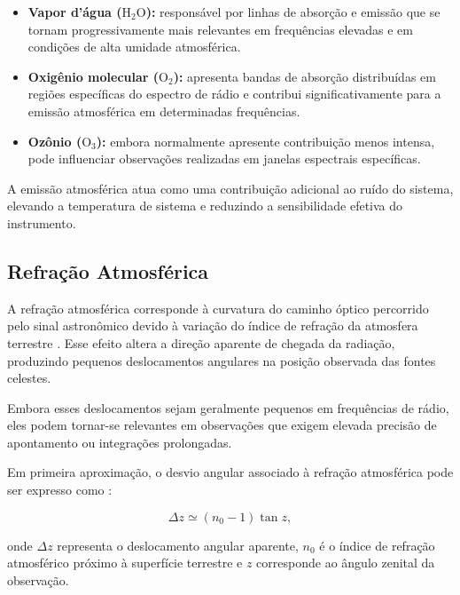 \begin{itemize}

\item \textbf{Vapor d'água ($\mathrm{H_2O}$):}
responsável por linhas de absorção e emissão que se tornam progressivamente mais relevantes em frequências elevadas e em condições de alta umidade atmosférica.

\item \textbf{Oxigênio molecular ($\mathrm{O_2}$):}
apresenta bandas de absorção distribuídas em regiões específicas do espectro de rádio e contribui significativamente para a emissão atmosférica em determinadas frequências.

\item \textbf{Ozônio ($\mathrm{O_3}$):}
embora normalmente apresente contribuição menos intensa, pode influenciar observações realizadas em janelas espectrais específicas.

\end{itemize}

A emissão atmosférica atua como uma contribuição adicional ao ruído do sistema, elevando a temperatura de sistema e reduzindo a sensibilidade efetiva do instrumento.

\subsection{Refração Atmosférica}

A refração atmosférica corresponde à curvatura do caminho óptico percorrido pelo sinal astronômico devido à variação do índice de refração da atmosfera terrestre \cite{thompson2017interferometry}. Esse efeito altera a direção aparente de chegada da radiação, produzindo pequenos deslocamentos angulares na posição observada das fontes celestes.

Embora esses deslocamentos sejam geralmente pequenos em frequências de rádio, eles podem tornar-se relevantes em observações que exigem elevada precisão de apontamento ou integrações prolongadas.

Em primeira aproximação, o desvio angular associado à refração atmosférica pode ser expresso como \cite{thompson2017interferometry}:

\begin{equation}
\Delta z \simeq (n_0 - 1)\tan z,
\end{equation}

onde $\Delta z$ representa o deslocamento angular aparente, $n_0$ é o índice de refração atmosférico próximo à superfície terrestre e $z$ corresponde ao ângulo zenital da observação.

